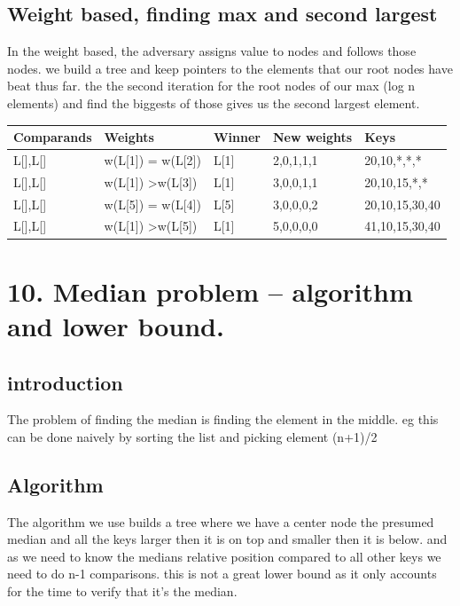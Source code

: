 \documentclass[a4paper,10pt,titlepage]{report}
\begin{document}
\subsection{Weight based, finding max and second largest}
In the weight based, the adversary assigns value to nodes and follows those nodes.
we build a tree and keep pointers to the elements that our root nodes have beat thus far. the the second iteration for the root nodes of our max (log n elements) and find the biggests of those gives us the second largest element.
\begin{tabular}{lllll}
\hline
Comparands & Weights & Winner & New weights & Keys \\ \hline
L{[}{]},L{[}{]} & w(L{[}1{]}) = w(L{[}2{]}) & L{[}1{]} & 2,0,1,1,1 & 20,10,*,*,* \\
L{[}{]},L{[}{]} & w(L{[}1{]}) \textgreater w(L{[}3{]}) & L{[}1{]} & 3,0,0,1,1 & 20,10,15,*,* \\
L{[}{]},L{[}{]} & w(L{[}5{]}) = w(L{[}4{]}) & L{[}5{]} & 3,0,0,0,2 & 20,10,15,30,40 \\
L{[}{]},L{[}{]} & w(L{[}1{]}) \textgreater w(L{[}5{]}) & L{[}1{]} & 5,0,0,0,0 & 41,10,15,30,40 \\ \hline
\end{tabular}
\vspace{5mm}



\newpage
\section{10. Median problem – algorithm and lower bound.}

\subsection{introduction}
The problem of finding the median is finding the element in the middle. eg this can be done naively by sorting the list and picking element (n+1)/2\\

\subsection{Algorithm}
The algorithm we use builds a tree where we have a center node the presumed median and all the keys larger then it is on top and smaller then it is below. and as we need to know the medians relative position compared to all other keys we need to do n-1 comparisons. this is not a great lower bound as it only accounts for the time to verify that it's the median.\\
\end{document}
